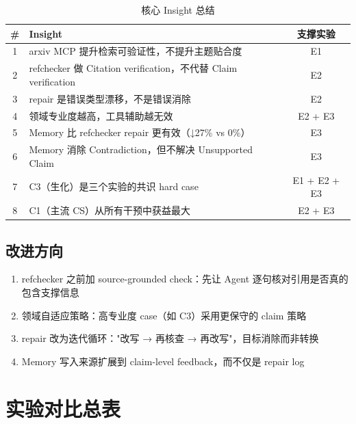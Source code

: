 \documentclass[UTF8,fontset=fandol,a4paper,12pt]{ctexart}
\begin{document}
\begin{table}[htbp]
  \centering
  \caption{核心 Insight 总结}
  \begin{tabularx}{\textwidth}{@{}cXc@{}}
    \toprule
    \# & Insight & 支撑实验 \\
    \midrule
    1 & arxiv MCP 提升检索可验证性，不提升主题贴合度 & E1 \\
    2 & refchecker 做 Citation verification，不代替 Claim verification & E2 \\
    3 & repair 是错误类型漂移，不是错误消除 & E2 \\
    4 & 领域专业度越高，工具辅助越无效 & E2 + E3 \\
    5 & Memory 比 refchecker repair 更有效（↓27\% vs 0\%） & E3 \\
    6 & Memory 消除 Contradiction，但不解决 Unsupported Claim & E3 \\
    7 & C3（生化）是三个实验的共识 hard case & E1 + E2 + E3 \\
    8 & C1（主流 CS）从所有干预中获益最大 & E2 + E3 \\
    \bottomrule
  \end{tabularx}
\end{table}

\subsection{改进方向}

\begin{enumerate}[nosep]
  \item refchecker 之前加 source-grounded check：先让 Agent 逐句核对引用是否真的包含支撑信息
  \item 领域自适应策略：高专业度 case（如 C3）采用更保守的 claim 策略
  \item repair 改为迭代循环："改写 → 再核查 → 再改写"，目标消除而非转换
  \item Memory 写入来源扩展到 claim-level feedback，而不仅是 repair log
\end{enumerate}

\section{实验对比总表}
\end{document}
